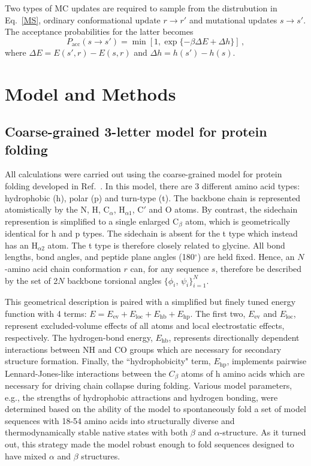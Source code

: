 \documentclass[
aip,
rsi,%
amsmath,amssymb,
reprint,%
]{revtex4-1}
\newcommand	 {\sbar}	{{s}}
\newcommand	 {\rbar}	{{r}}
\begin{document}
Two types of MC updates are required to sample from the distrubution in Eq.~\ref{MS}, ordinary conformational update $\rbar\rightarrow\rbar'$ and mutational updates $\sbar\rightarrow\sbar'$. The acceptance probabilities for the latter  becomes
\begin{equation}
P_\mathrm{acc} (\sbar\rightarrow\sbar') = \min [1, \exp\{-\beta\Delta E+\Delta h\}]\,,
\label{accrej}
\end{equation}
where $\Delta E = E(\sbar',\rbar)-E(\sbar,\rbar)$ and $\Delta h = h({\sbar'})-h(\sbar)$.

\section{Model and Methods}
\subsection{Coarse-grained 3-letter model for protein folding}
\noindent
All calculations were carried out using the coarse-grained model for protein folding developed in Ref.~. In this model, there are 3 different amino acid types: hydrophobic (h), polar (p) and turn-type (t). The backbone chain is represented atomistically by the N, H, $\mathrm{C}_\alpha$, $\mathrm{H}_{\alpha 1}$, C$'$ and O atoms. By contrast, the sidechain represention is simplified to a single enlarged $\mathrm{C}_\beta$ atom, which is geometrically identical for h and p types. The sidechain is absent for the t type which instead has an $\mathrm{H}_{\alpha 2}$ atom. The t type is therefore closely related to glycine. All bond lengths, bond angles, and peptide plane angles (180$^\circ$) are held fixed. Hence, an $N$-amino acid chain conformation $\rbar$ can, for any sequence $\sbar$, therefore be described by the set of 2$N$ backbone torsional angles $\{\phi_i$, $\psi_i\}_{i=1}^{N}$. 
 
This geometrical description is paired with a simplified but finely tuned energy function with 4 terms: $E= E_\mathrm{ev} + E_\mathrm{loc} + E_\mathrm{hb} + E_\mathrm{hp}$. The first two, $E_\mathrm{ev}$ and $E_\mathrm{loc}$, represent excluded-volume effects of all atoms and local electrostatic effects, respectively. The hydrogen-bond energy, $E_\mathrm{hb}$, represents directionally dependent interactions between NH and CO groups which are necessary for secondary structure formation. Finally, the ``hydrophobicity" term, $E_\mathrm{hp}$, implements pairwise Lennard-Jones-like interactions between the $C_\beta$ atoms of h amino acids which are necessary for driving chain collapse during folding. Various model parameters, e.g., the strengths of hydrophobic attractions and hydrogen bonding, were determined based on the ability of the model to spontaneously fold a set of model sequences with 18-54 amino acids into  structurally diverse and thermodynamically stable native states with both $\beta$ and $\alpha$-structure. As it turned out, this strategy made the model robust enough to fold sequences designed to have mixed $\alpha$ and $\beta$ structures. 
\end{document}
